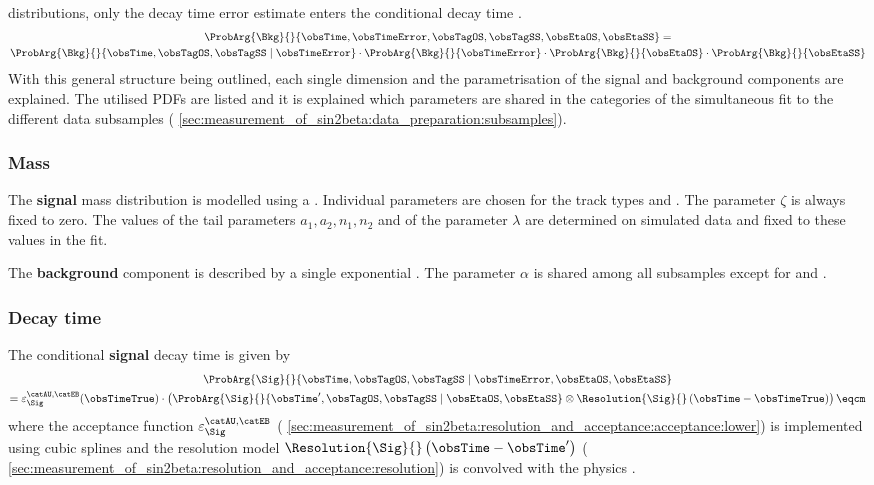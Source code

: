 distributions, only the decay time error estimate enters the conditional decay
time \PDF.
%
\begin{multline}
  \ProbArg{\Bkg}{}{\obsTime, \obsTimeError, \obsTagOS, \obsTagSS, \obsEtaOS, \obsEtaSS} = \\ 
  \ProbArg{\Bkg}{}{\obsTime, \obsTagOS, \obsTagSS \mid \obsTimeError} \cdot
  \ProbArg{\Bkg}{}{\obsTimeError} \cdot
  \ProbArg{\Bkg}{}{\obsEtaOS} \cdot
  \ProbArg{\Bkg}{}{\obsEtaSS}
\end{multline}
%
With this general structure being outlined, each single dimension and the
parametrisation of the signal and background components are explained. The
utilised \acp{PDF} are listed and it is explained which parameters are shared in
the categories of the simultaneous fit to the different data subsamples (\cf
\cref{sec:measurement_of_sin2beta:data_preparation:subsamples}).

\subsubsection{Mass}
\label{sec:measurement_of_sin2beta:likelihood_fit:model:mass}

The \textbf{signal} mass distribution is modelled using a \Ipatia \PDF.
Individual parameters are chosen for the track types \catDD and \catLL. The
parameter $\zeta$ is always fixed to zero. The values of the tail parameters
$a_1, a_2, n_1, n_2$ and of the parameter $\lambda$ are determined on simulated
data and fixed to these values in the fit.

The \textbf{background} component is described by a single exponential \PDF. The
parameter $\alpha$ is shared among all subsamples except for \catDD and \catLL.

\subsubsection{Decay time}
\label{sec:measurement_of_sin2beta:likelihood_fit:model:decay_time}


The conditional \textbf{signal} decay time \PDF is given by
%
\begin{multline}
    \ProbArg{\Sig}{}{\obsTime, \obsTagOS, \obsTagSS \mid \obsTimeError, \obsEtaOS, \obsEtaSS} \\ 
  = \varepsilon_{\Sig}^{\text{\catAU,\catEB}}(\obsTimeTrue) \cdot \left(\ProbArg{\Sig}{}{\obsTime^\prime, \obsTagOS, \obsTagSS \mid \obsEtaOS, \obsEtaSS} \otimes \Resolution{\Sig}{}\left(\obsTime-\obsTimeTrue\right)\right)\eqcm
\end{multline}
%
where the acceptance function $\varepsilon_{\Sig}^{\text{\catAU,\catEB}}$ (\cf
\cref{sec:measurement_of_sin2beta:resolution_and_acceptance:acceptance:lower})
is implemented using cubic splines \cite{Karbach:2014qba} and the resolution
model $\Resolution{\Sig}{}\left(\obsTime-\obsTime^\prime\right)$ (\cf
\cref{sec:measurement_of_sin2beta:resolution_and_acceptance:resolution}) is
convolved with the \B physics \PDF.

